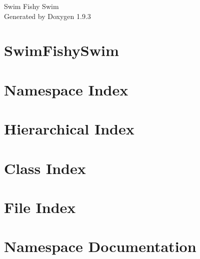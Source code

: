 \documentclass[twoside]{book}
\newcommand{\+}{\discretionary{\mbox{\scriptsize$\hookleftarrow$}}{}{}}
\newcommand{\clearemptydoublepage}{%
    \newpage{\pagestyle{empty}\cleardoublepage}%
  }
\begin{document}
  \raggedbottom
    \hypersetup{pageanchor=false,
                bookmarksnumbered=true,
                pdfencoding=unicode
               }
  \begin{titlepage}
  \vspace*{7cm}
  \begin{center}%
  {\Large Swim Fishy Swim}\\
  \vspace*{1cm}
  {\large Generated by Doxygen 1.9.3}\\
  \end{center}
  \end{titlepage}
  \clearemptydoublepage
  \tableofcontents
  \clearemptydoublepage
  \hypersetup{pageanchor=true}
\chapter{Swim\+Fishy\+Swim}
\label{md__c___team_sheeps__swim_fishy_swim__r_e_a_d_m_e}

\chapter{Namespace Index}

\chapter{Hierarchical Index}

\chapter{Class Index}

\chapter{File Index}

\chapter{Namespace Documentation}

\end{document}
